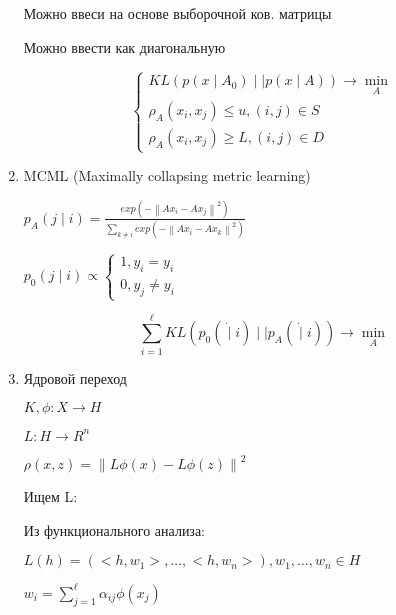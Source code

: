 \documentclass[a4paper, 12pt]{article}
\newcommand\norm[1]{\left\lVert#1\right\rVert}
\begin{document}
\begin{enumerate}
    Можно ввеси на основе выборочной ков. матрицы

    Можно ввести как диагональную

    \[\begin{cases}
        KL(p(x \mid A_0) \mid\mid p(x \mid A)) \rightarrow \min_{A} \\
        \rho_A(x_i, x_j) \leq u, (i, j) \in S \\
        \rho_A(x_i, x_j) \geq L, (i, j) \in D
    \end{cases}\]

    \item MCML (Maximally collapsing metric learning)
    
    $p_A(j \mid i) = \frac{exp(- \norm{Ax_i - Ax_j}^2)}
    {\sum_{k \neq i}exp(- \norm{Ax_i - Ax_k}^2)}$

    $p_0(j \mid i) \propto
    \begin{cases}
        1, y_i = y_i \\
        0, y_j \neq y_i
    \end{cases}$

    \[\sum_{i = 1}^{\ell} KL(p_0(\dot \mid i) 
    \mid \mid p_A(\dot \mid i)) \rightarrow \min_A\]

    \item Ядровой переход
    
    $K, \phi: X \to H$

    $L: H \to R^n$

    $\rho(x, z) = \norm{L\phi(x) - L\phi(z)}^2$

    Ищем L:

    Из функционального анализа:

    \(L(h) = (<h, w_1>, \ldots, <h, w_n>), w_1, \ldots, w_n \in H\)

    \(w_i = \sum_{j = 1}^{\ell} \alpha_{ij}\phi(x_j)\)
\end{enumerate}
\end{document}
